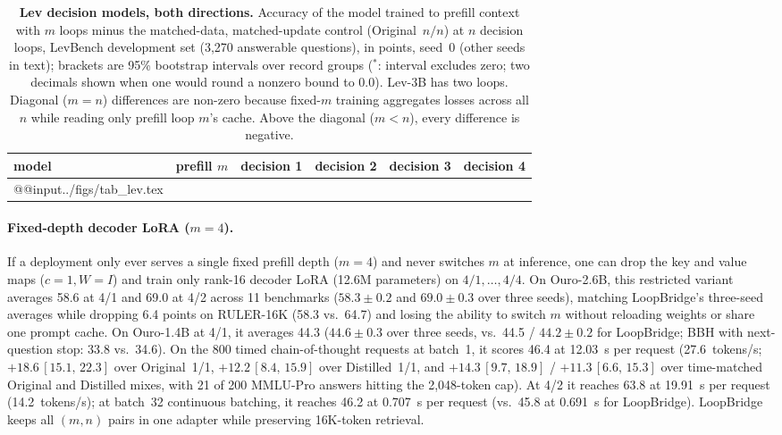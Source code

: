 \documentclass[11pt]{article}
\newcommand{\ci}[2]{\,{\scriptsize\ensuremath{[#1,\,#2]}}}
\begin{document}
\begin{table}[t]
\centering\small
\setlength\tabcolsep{5pt}
\begin{tabular}{@{}lccccc@{}}
\toprule
model & prefill $m$ & decision 1 & decision 2 & decision 3 & decision 4 \\
\midrule
\csname @@input\endcsname ../figs/tab_lev.tex
\bottomrule
\end{tabular}
\caption{\textbf{Lev decision models, both directions.} Accuracy of the model trained to prefill context with $m$ loops
minus the matched-data, matched-update control (Original~$n/n$) at $n$ decision loops, LevBench development set (3,270
answerable questions), in points, seed~0 (other seeds in text); brackets are 95\% bootstrap intervals over record groups
($^*$: interval excludes zero; two decimals shown when one would round a nonzero bound to 0.0). Lev-3B has two loops.
Diagonal ($m=n$) differences are non-zero because fixed-$m$ training aggregates losses across all $n$ while reading only
prefill loop $m$'s cache. Above the diagonal ($m<n$), every difference is negative.}
\label{tab:lev}
\end{table}

\paragraph{Fixed-depth decoder LoRA ($m=4$).} If a deployment only ever serves a single fixed prefill depth ($m=4$) and
never switches $m$ at inference, one can drop the key and value maps ($c=1, W=I$) and train only rank-16 decoder LoRA
(12.6M parameters) on $4/1,\dots,4/4$. On Ouro-2.6B, this restricted variant averages 58.6 at 4/1 and 69.0 at 4/2 across
11 benchmarks ($58.3\pm0.2$ and $69.0\pm0.3$ over three seeds), matching LoopBridge's three-seed averages while dropping
6.4 points on RULER-16K (58.3 vs.\ 64.7) and losing the ability to switch $m$ without reloading weights or share one
prompt cache. On Ouro-1.4B at 4/1, it averages 44.3 ($44.6\pm0.3$ over three seeds, vs.\ 44.5 / $44.2\pm0.2$ for
LoopBridge; BBH with next-question stop: 33.8 vs.\ 34.6). On the 800 timed chain-of-thought requests at batch~1, it
scores 46.4 at 12.03~s per request (27.6~\mbox{tokens/s}; $+18.6$\ci{15.1}{22.3} over Original~1/1,
$+12.2$\ci{8.4}{15.9} over Distilled~1/1, and $+14.3$\ci{9.7}{18.9} / $+11.3$\ci{6.6}{15.3} over time-matched Original
and Distilled mixes, with 21 of 200 MMLU-Pro answers hitting the 2,048-token cap). At 4/2 it reaches 63.8 at 19.91~s per
request (14.2~\mbox{tokens/s}); at batch~32 continuous batching, it reaches 46.2 at 0.707~s per request (vs.\ 45.8 at
0.691~s for LoopBridge). LoopBridge keeps all $(m,n)$ pairs in one adapter while preserving 16K-token retrieval.
\end{document}

